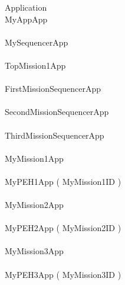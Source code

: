 \begin{circus}
\circprocess  Application \circdef \\
\circblockopen
MyAppApp\\
\interleave\\
MySequencerApp\\
\interleave \\
		TopMission1App\\
		\interleave \\
			FirstMissionSequencerApp\\
			\interleave \\
			SecondMissionSequencerApp\\
			\interleave \\
			ThirdMissionSequencerApp\\
			
		
		\interleave \\
		MyMission1App\\
		\interleave \\
			MyPEH1App ( MyMission1ID  ) \\
			
		
		\interleave \\
		MyMission2App\\
		\interleave \\
			MyPEH2App ( MyMission2ID  ) \\
			
		
		\interleave \\
		MyMission3App\\
		\interleave \\
			MyPEH3App ( MyMission3ID  ) \\
			
		
\circblockclose
\end{circus}
